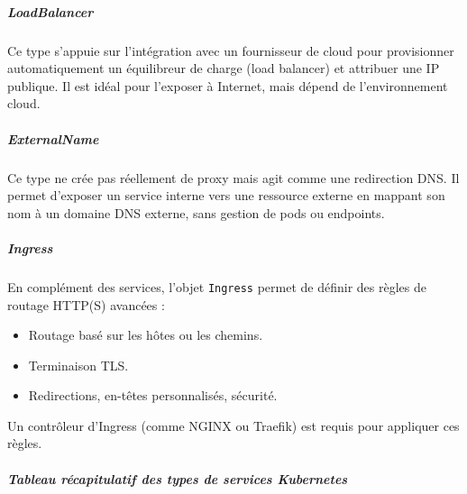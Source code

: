 \subparagraph{LoadBalancer}
Ce type s’appuie sur l’intégration avec un fournisseur de cloud pour provisionner automatiquement un équilibreur de charge (load balancer) et attribuer une IP publique. Il est idéal pour l’exposer à Internet, mais dépend de l’environnement cloud.

\subparagraph{ExternalName}
Ce type ne crée pas réellement de proxy mais agit comme une redirection DNS. Il permet d’exposer un service interne vers une ressource externe en mappant son nom à un domaine DNS externe, sans gestion de pods ou endpoints.

\subparagraph{Ingress}
En complément des services, l’objet \texttt{Ingress} permet de définir des règles de routage HTTP(S) avancées :
\begin{itemize}
	\item Routage basé sur les hôtes ou les chemins.
	\item Terminaison TLS.
	\item Redirections, en-têtes personnalisés, sécurité.
\end{itemize}
Un contrôleur d’Ingress (comme NGINX ou Traefik) est requis pour appliquer ces règles.

\bigskip

\subparagraph{Tableau récapitulatif des types de services Kubernetes}

